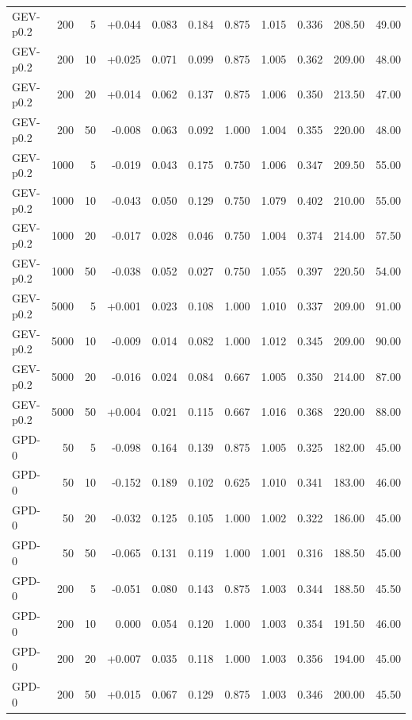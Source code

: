 \begin{table}[t]
\begin{tabular}{lrrrrrrrrrr}
GEV-p0.2 &  200 &    5 & +0.044 & 0.083 & 0.184 & 0.875 & 1.015 & 0.336 & 208.50 & 49.00 \\
GEV-p0.2 &  200 &   10 & +0.025 & 0.071 & 0.099 & 0.875 & 1.005 & 0.362 & 209.00 & 48.00 \\
GEV-p0.2 &  200 &   20 & +0.014 & 0.062 & 0.137 & 0.875 & 1.006 & 0.350 & 213.50 & 47.00 \\
GEV-p0.2 &  200 &   50 & -0.008 & 0.063 & 0.092 & 1.000 & 1.004 & 0.355 & 220.00 & 48.00 \\
GEV-p0.2 & 1000 &    5 & -0.019 & 0.043 & 0.175 & 0.750 & 1.006 & 0.347 & 209.50 & 55.00 \\
GEV-p0.2 & 1000 &   10 & -0.043 & 0.050 & 0.129 & 0.750 & 1.079 & 0.402 & 210.00 & 55.00 \\
GEV-p0.2 & 1000 &   20 & -0.017 & 0.028 & 0.046 & 0.750 & 1.004 & 0.374 & 214.00 & 57.50 \\
GEV-p0.2 & 1000 &   50 & -0.038 & 0.052 & 0.027 & 0.750 & 1.055 & 0.397 & 220.50 & 54.00 \\
GEV-p0.2 & 5000 &    5 & +0.001 & 0.023 & 0.108 & 1.000 & 1.010 & 0.337 & 209.00 & 91.00 \\
GEV-p0.2 & 5000 &   10 & -0.009 & 0.014 & 0.082 & 1.000 & 1.012 & 0.345 & 209.00 & 90.00 \\
GEV-p0.2 & 5000 &   20 & -0.016 & 0.024 & 0.084 & 0.667 & 1.005 & 0.350 & 214.00 & 87.00 \\
GEV-p0.2 & 5000 &   50 & +0.004 & 0.021 & 0.115 & 0.667 & 1.016 & 0.368 & 220.00 & 88.00 \\
GPD-0 &   50 &    5 & -0.098 & 0.164 & 0.139 & 0.875 & 1.005 & 0.325 & 182.00 & 45.00 \\
GPD-0 &   50 &   10 & -0.152 & 0.189 & 0.102 & 0.625 & 1.010 & 0.341 & 183.00 & 46.00 \\
GPD-0 &   50 &   20 & -0.032 & 0.125 & 0.105 & 1.000 & 1.002 & 0.322 & 186.00 & 45.00 \\
GPD-0 &   50 &   50 & -0.065 & 0.131 & 0.119 & 1.000 & 1.001 & 0.316 & 188.50 & 45.00 \\
GPD-0 &  200 &    5 & -0.051 & 0.080 & 0.143 & 0.875 & 1.003 & 0.344 & 188.50 & 45.50 \\
GPD-0 &  200 &   10 & 0.000 & 0.054 & 0.120 & 1.000 & 1.003 & 0.354 & 191.50 & 46.00 \\
GPD-0 &  200 &   20 & +0.007 & 0.035 & 0.118 & 1.000 & 1.003 & 0.356 & 194.00 & 45.00 \\
GPD-0 &  200 &   50 & +0.015 & 0.067 & 0.129 & 0.875 & 1.003 & 0.346 & 200.00 & 45.50 \\

\end{tabular}
\end{table}
